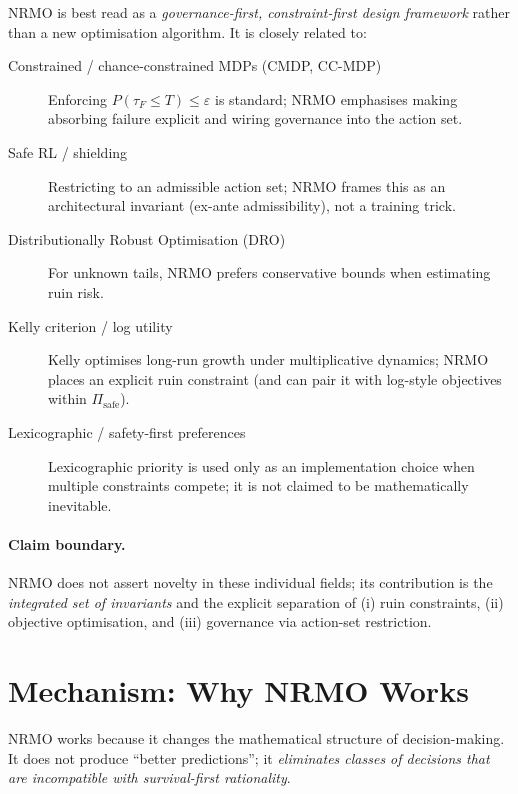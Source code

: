 NRMO is best read as a \emph{governance-first, constraint-first
design framework} rather than a new optimisation algorithm. It is
closely related to:

\begin{description}
\item[Constrained / chance-constrained MDPs (CMDP, CC-MDP)]
Enforcing $P(\tau_F \le T) \le \varepsilon$ is standard; NRMO
emphasises making absorbing failure explicit and wiring governance
into the action set.

\item[Safe RL / shielding] Restricting to an admissible action set;
NRMO frames this as an architectural invariant (ex-ante
admissibility), not a training trick.

\item[Distributionally Robust Optimisation (DRO)] For unknown tails,
NRMO prefers conservative bounds when estimating ruin risk.

\item[Kelly criterion / log utility] Kelly optimises long-run growth
under multiplicative dynamics; NRMO places an explicit ruin
constraint (and can pair it with log-style objectives within
$\Pi_{\mathrm{safe}}$).

\item[Lexicographic / safety-first preferences] Lexicographic
priority is used only as an implementation choice when multiple
constraints compete; it is not claimed to be mathematically
inevitable.
\end{description}

\paragraph{Claim boundary.}
NRMO does not assert novelty in these individual fields; its
contribution is the \emph{integrated set of invariants} and the
explicit separation of (i) ruin constraints, (ii) objective
optimisation, and (iii) governance via action-set restriction.

\section{Mechanism: Why NRMO Works}
\label{sec:foundations-5-mechanism-why}

NRMO works because it changes the mathematical structure of
decision-making. It does not produce ``better predictions''; it
\emph{eliminates classes of decisions that are incompatible with
survival-first rationality}.

